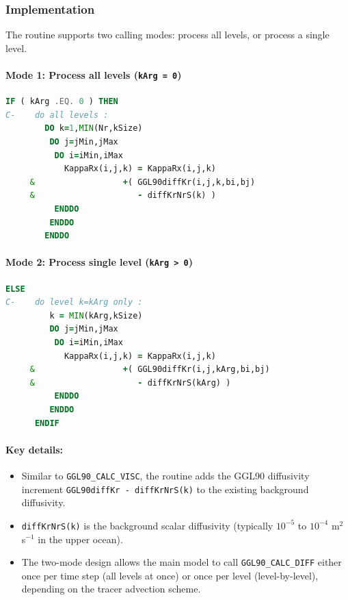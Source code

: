 \documentclass[12pt,letterpaper]{article}
\begin{document}
\subsubsection{Implementation}

The routine supports two calling modes: process all levels, or process a single level.

\paragraph{Mode 1: Process all levels (\texttt{kArg = 0})}

\begin{lstlisting}[language=Fortran,caption={(ggl90\_calc\_diff.F:L48--58) Add GGL90 diffusivity: all levels}]
      IF ( kArg .EQ. 0 ) THEN
C-    do all levels :
        DO k=1,MIN(Nr,kSize)
         DO j=jMin,jMax
          DO i=iMin,iMax
            KappaRx(i,j,k) = KappaRx(i,j,k)
     &                  +( GGL90diffKr(i,j,k,bi,bj)
     &                     - diffKrNrS(k) )
          ENDDO
         ENDDO
        ENDDO
\end{lstlisting}

\paragraph{Mode 2: Process single level (\texttt{kArg > 0})}

\begin{lstlisting}[language=Fortran,caption={(ggl90\_calc\_diff.F:L59--69) Add GGL90 diffusivity: single level}]
      ELSE
C-    do level k=kArg only :
         k = MIN(kArg,kSize)
         DO j=jMin,jMax
          DO i=iMin,iMax
            KappaRx(i,j,k) = KappaRx(i,j,k)
     &                  +( GGL90diffKr(i,j,kArg,bi,bj)
     &                     - diffKrNrS(kArg) )
          ENDDO
         ENDDO
      ENDIF
\end{lstlisting}

\paragraph{Key details:}
\begin{itemize}
\item Similar to \verb|GGL90_CALC_VISC|, the routine adds the GGL90 diffusivity increment \verb|GGL90diffKr - diffKrNrS(k)| to the existing background diffusivity.
\item \verb|diffKrNrS(k)| is the background scalar diffusivity (typically $10^{-5}$ to $10^{-4}$ m$^2$ s$^{-1}$ in the upper ocean).
\item The two-mode design allows the main model to call \verb|GGL90_CALC_DIFF| either once per time step (all levels at once) or once per level (level-by-level), depending on the tracer advection scheme.
\end{itemize}
\end{document}
